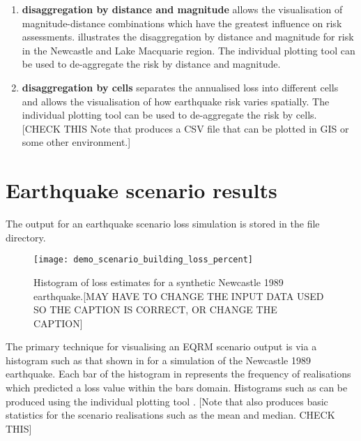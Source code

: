 \begin{enumerate}
\item \textbf{disaggregation by distance and magnitude} allows the
visualisation of magnitude-distance combinations which have the
greatest influence on risk assessments.
 illustrates the disaggregation by
distance and magnitude for risk in the Newcastle and Lake
Macquarie region. The individual plotting tool
 can be used
to de-aggregate the risk by
distance and magnitude. 

\item \textbf{disaggregation by cells} separates
the annualised loss into different cells and allows the
visualisation of how earthquake risk varies spatially. The
individual plotting tool
 can be used 
 to de-aggregate the risk by
cells. [CHECK THIS Note that 
produces a CSV file that can be plotted in GIS or some other
environment.]
\end{enumerate}

\section{Earthquake scenario results}

The output for an earthquake scenario loss simulation is 
stored in the file
 directory. 
\begin{figure}
\texttt{[image: demo\_scenario\_building\_loss\_percent]}
\caption{Histogram of loss estimates for a synthetic Newcastle
1989 earthquake.[MAY HAVE TO CHANGE THE INPUT DATA USED SO THE CAPTION
IS CORRECT, OR CHANGE THE CAPTION]} \label{fig:scenario-hist}
\end{figure}
The primary technique for visualising an EQRM scenario output is
via a histogram such as that shown in  for
a simulation of the Newcastle 1989 earthquake. Each bar of the
histogram in  represents the frequency of
realisations which predicted a loss value within the bars domain.
Histograms such as  can be produced using
the individual plotting tool
.
 [Note that
 also produces basic
statistics for the scenario realisations such as the mean and
median. CHECK THIS]

